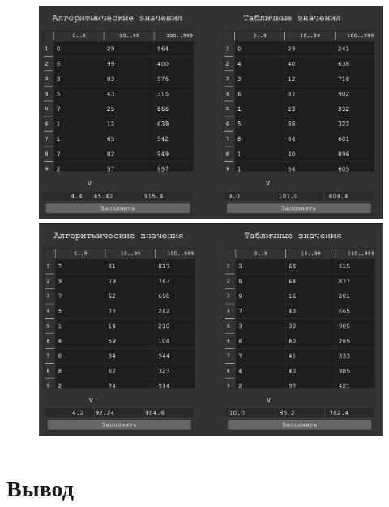 \documentclass[a4paper,12pt]{article}
\begin{document}
	\begin{figure}[h!]
		\begin{minipage}[b]{0.5\textwidth}
			\includegraphics[width=\textwidth]{examples/3.png}
		\end{minipage}
		\begin{minipage}[b]{0.5\textwidth}
			\includegraphics[width=\textwidth]{examples/4.png}
		\end{minipage}
		\label{ris:examples_3_4}
	\end{figure}
	
	\section*{Вывод}
	
\end{document}
